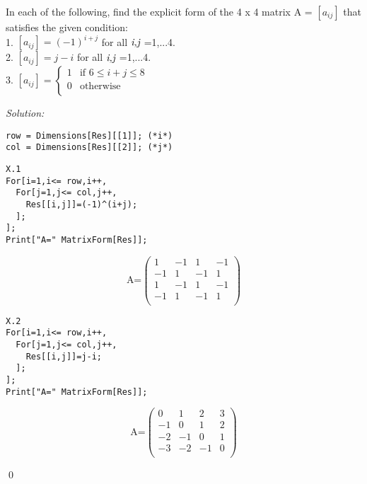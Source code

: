 \documentclass[12pt]{article}
\newenvironment{problem}[2][Problem]{\begin{trivlist}
\item[\hskip \labelsep {\bfseries #1}\hskip \labelsep {\bfseries #2.}]}{\end{trivlist}}
\newenvironment{sol}
    {\emph{Solution:}
    }
    {
    \qed
    }
\begin{document}
\begin{problem}{X}
In each of the following, find the explicit form of the 4 x 4 matrix A = $[a_{ij}]$ that satisfies the given condition:\\
1. $[a_{ij}] = (-1)^{i+j}$ for all ${\emph{i,j}}$ =1,...4.\\
2. $[a_{ij}] = j-i$ for all ${\emph{i,j}}$ =1,...4.\\
3. $[a_{ij}] = \left\{
\begin{array}{cc}
 1 & \text{if }6\leq i+j\leq 8 \\
 0 & \text{otherwise} \\
\end{array}
\right.$\\
\end{problem}
\begin{sol}
\begin{lstlisting}
row = Dimensions[Res][[1]]; (*i*)
col = Dimensions[Res][[2]]; (*j*)
\end{lstlisting}

\begin{lstlisting}
X.1
For[i=1,i<= row,i++,
  For[j=1,j<= col,j++,
    Res[[i,j]]=(-1)^(i+j);
  ];
];
Print["A=" MatrixForm[Res]];
\end{lstlisting}
\begin{equation}
\text{A=} \left(
\begin{array}{cccc}
 1 & -1 & 1 & -1 \\
 -1 & 1 & -1 & 1 \\
 1 & -1 & 1 & -1 \\
 -1 & 1 & -1 & 1 \\
\end{array}
\right)
\end{equation}

\begin{lstlisting}
X.2
For[i=1,i<= row,i++,
  For[j=1,j<= col,j++,
    Res[[i,j]]=j-i;
  ];
];
Print["A=" MatrixForm[Res]];
\end{lstlisting}
\begin{equation}
\text{A=} \left(
\begin{array}{cccc}
 0 & 1 & 2 & 3 \\
 -1 & 0 & 1 & 2 \\
 -2 & -1 & 0 & 1 \\
 -3 & -2 & -1 & 0 \\
\end{array}
\right)
\end{equation}


\end{sol}
\end{document}

